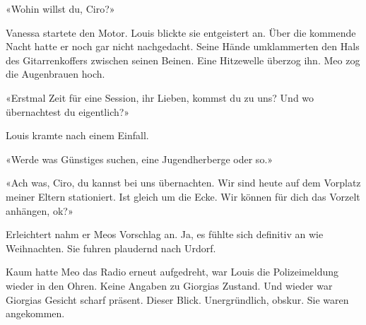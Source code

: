 «Wohin willst du, Ciro?»

Vanessa startete den Motor.
Louis blickte sie entgeistert an. Über die kommende Nacht hatte er noch
gar nicht nachgedacht. Seine Hände umklammerten den Hals des
Gitarrenkoffers zwischen seinen Beinen. Eine Hitzewelle überzog ihn.
Meo zog die Augenbrauen hoch.

«Erstmal Zeit für eine Session, ihr Lieben, kommst du zu uns? Und wo
übernachtest du eigentlich?»

Louis kramte nach einem Einfall.

«Werde was Günstiges suchen, eine Jugendherberge oder so.»

«Ach was, Ciro, du kannst bei uns übernachten. Wir sind heute auf dem
Vorplatz meiner Eltern stationiert. Ist gleich um die Ecke. Wir können
für dich das Vorzelt anhängen, ok?»

Erleichtert nahm er Meos Vorschlag an. Ja, es fühlte sich
definitiv an wie Weihnachten. Sie fuhren plaudernd nach Urdorf.

Kaum hatte Meo das Radio erneut aufgedreht, war Louis die Polizeimeldung
wieder in den Ohren. Keine Angaben zu Giorgias Zustand.
Und wieder war Giorgias Gesicht scharf präsent. Dieser Blick.
Unergründlich, obskur. 
Sie waren angekommen.
